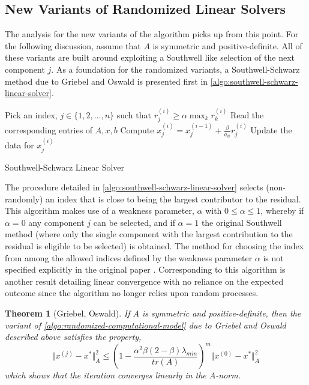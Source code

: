 \documentclass{article}
\newtheorem{theorem}{Theorem}
\theoremstyle{definition}
\theoremstyle{example}
\theoremstyle{example}
\theoremstyle{example}
\begin{document}
\subsection{New Variants of Randomized Linear Solvers}
\label{sect:new-variants-of-randomized-linear-solvers}

The analysis for the new variants of the algorithm picks up from this point. For the following discussion, assume that $A$ is symmetric and positive-definite. All of these variants are built around exploiting a Southwell like selection of the next component $j$. As a foundation for the randomized variants, a Southwell-Schwarz method due to Griebel and Oswald is presented first in \cref{algo:southwell-schwarz-linear-solver}.

\begin{algorithm}[ht!]
	\DontPrintSemicolon
	 {
		 {
			Pick an index, $j \in \{1, 2, \ldots, n\}$ such that $r_j^{(i)} \geq \alpha \max_k r_k^{(i)}$ \; \label{alg:picksouthwell}
			Read the corresponding entries of $A, x, b$ \label{step:read25}\;
			Compute $x^{(i)}_j = x^{(i-1)}_j + \frac{\beta}{a_{ii}} r^{(i)}_j$ \;
			Update the data for $x^{(i)}_j$ \;
		}
	}
	\caption{Southwell-Schwarz Linear Solver}
	\label{algo:southwell-schwarz-linear-solver}
\end{algorithm}

The procedure detailed in \cref{algo:southwell-schwarz-linear-solver} selects (non-randomly) an index that is close to being the largest contributor to the residual. This algorithm makes use of a weakness parameter, $\alpha$ with $0 \leq \alpha \leq 1$, whereby if $\alpha = 0$ any component $j$ can be selected, and if $\alpha = 1$ the original Southwell method (where only the single component with the largest contribution to the residual is eligible to be selected) is obtained. The method for choosing the index from among the allowed indices defined by the weakness parameter $\alpha$ is not specified explicitly in the original paper \cite{griebel2012greedy}. Corresponding to this algorithm is another result detailing linear convergence with no reliance on the expected outcome since the algorithm no longer relies upon random processes.

\begin{theorem}[Griebel, Oswald]
\label{th:southwell-schwarz}
	If $A$ is symmetric and positive-definite, then the variant of \cref{algo:randomized-computational-model} due to Griebel and Oswald described above satisfies the property,
	\begin{equation}
	\Vert x^{(j)} - x^* \Vert_A^2 \leq \left(1 - \frac{\alpha^2 \beta (2 - \beta)\lambda_{min}}{tr(A)}\right)^m \Vert x^{(0)} - x^* \Vert_A^2
	\end{equation}
	which shows that the iteration converges linearly in the $A$-norm.
\end{theorem}
\end{document}
